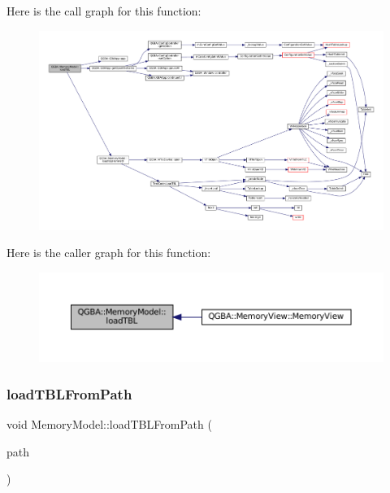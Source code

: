 Here is the call graph for this function\+:
\nopagebreak
\begin{figure}[H]
\begin{center}
\leavevmode
\includegraphics[width=350pt]{class_q_g_b_a_1_1_memory_model_a39b4c0fbfcdf26243af77bed0223c811_cgraph}
\end{center}
\end{figure}
Here is the caller graph for this function\+:
\nopagebreak
\begin{figure}[H]
\begin{center}
\leavevmode
\includegraphics[width=350pt]{class_q_g_b_a_1_1_memory_model_a39b4c0fbfcdf26243af77bed0223c811_icgraph}
\end{center}
\end{figure}
\mbox{\label{class_q_g_b_a_1_1_memory_model_aed4e9c661e52c82ddc958b8d6a457248}} 
\subsubsection{\texorpdfstring{load\+T\+B\+L\+From\+Path}{loadTBLFromPath}}
{\footnotesize\ttfamily void Memory\+Model\+::load\+T\+B\+L\+From\+Path (\begin{DoxyParamCaption}\item[{const Q\+String \&}]{path }\end{DoxyParamCaption})\hspace{0.3cm}{\ttfamily [slot]}}

